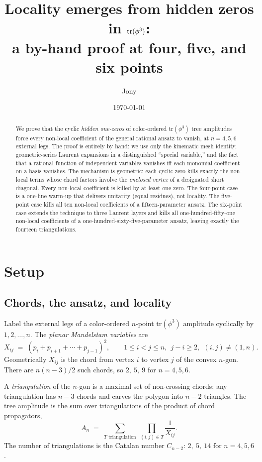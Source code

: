 \documentclass[11pt]{article}
\title{Locality emerges from hidden zeros in $\tphi$:\\
a by-hand proof at four, five, and six points}
\author{Jony}
\date{\today}
\newcommand{\tphi}{\mathrm{tr}(\phi^3)}
\begin{document}
\maketitle

\begin{abstract}
We prove that the cyclic \emph{hidden one-zeros} of color-ordered $\tphi$
tree amplitudes force every non-local coefficient of the general rational
ansatz to vanish, at $n = 4, 5, 6$ external legs. The proof is entirely
by hand: we use only the kinematic mesh identity, geometric-series Laurent
expansions in a distinguished ``special variable,'' and the fact that a
rational function of independent variables vanishes iff each monomial
coefficient on a basis vanishes. The mechanism is geometric: each cyclic
zero kills exactly the non-local terms whose chord factors involve the
\emph{enclosed vertex} of a designated short diagonal. Every non-local
coefficient is killed by at least one zero. The four-point case is a
one-line warm-up that delivers unitarity (equal residues), not locality.
The five-point case kills all ten non-local coefficients of a
fifteen-parameter ansatz. The six-point case extends the technique to
three Laurent layers and kills all one-hundred-fifty-one non-local
coefficients of a one-hundred-sixty-five-parameter ansatz, leaving
exactly the fourteen triangulations.
\end{abstract}

\tableofcontents

\section{Setup}

\subsection{Chords, the ansatz, and locality}

Label the external legs of a color-ordered $n$-point $\tphi$ amplitude
cyclically by $1, 2, \dots, n$. The \emph{planar Mandelstam variables}
are
\[
X_{ij} \;=\; (p_i + p_{i+1} + \cdots + p_{j-1})^2,
\qquad 1 \le i < j \le n,\ \ j - i \ge 2,\ \ (i,j) \ne (1,n).
\]
Geometrically $X_{ij}$ is the chord from vertex $i$ to vertex $j$ of the
convex $n$-gon. There are $n(n-3)/2$ such chords, so
$2,\ 5,\ 9$ for $n = 4, 5, 6$.

A \emph{triangulation} of the $n$-gon is a maximal set of non-crossing
chords; any triangulation has $n-3$ chords and carves the polygon into
$n-2$ triangles. The tree amplitude is the sum over triangulations of
the product of chord propagators,
\begin{equation}\label{eq:An}
A_n \;=\; \sum_{T \text{ triangulation}} \;\prod_{(i,j)\in T} \frac{1}{X_{ij}}.
\end{equation}
The number of triangulations is the Catalan number $C_{n-2}$:
$2,\ 5,\ 14$ for $n = 4, 5, 6$.
\end{document}
